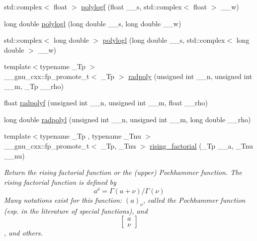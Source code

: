 \begin{DoxyCompactItemize}
\item 
std\+::complex$<$ float $>$ \hyperlink{group__gnu__math__spec__func_ga5376edb72358b777035a78b929deb49f}{polylogf} (float \+\_\+\+\_\+s, std\+::complex$<$ float $>$ \+\_\+\+\_\+w)
\item 
long double \hyperlink{group__gnu__math__spec__func_ga3aa007b4b4e345c30be015ab145d5598}{polylogl} (long double \+\_\+\+\_\+s, long double \+\_\+\+\_\+w)
\item 
std\+::complex$<$ long double $>$ \hyperlink{group__gnu__math__spec__func_ga9eb79e506eda210610bc59c1912b4d0f}{polylogl} (long double \+\_\+\+\_\+s, std\+::complex$<$ long double $>$ \+\_\+\+\_\+w)
\item 
{\footnotesize template$<$typename \+\_\+\+Tp $>$ }\\\+\_\+\+\_\+gnu\+\_\+cxx\+::fp\+\_\+promote\+\_\+t$<$ \+\_\+\+Tp $>$ \hyperlink{group__gnu__math__spec__func_ga195db2592888b7a8df870d9eaeff8d05}{radpoly} (unsigned int \+\_\+\+\_\+n, unsigned int \+\_\+\+\_\+m, \+\_\+\+Tp \+\_\+\+\_\+rho)
\item 
float \hyperlink{group__gnu__math__spec__func_ga8a98d7c7c14f1aadff90123a114fa2c9}{radpolyf} (unsigned int \+\_\+\+\_\+n, unsigned int \+\_\+\+\_\+m, float \+\_\+\+\_\+rho)
\item 
long double \hyperlink{group__gnu__math__spec__func_ga377febebd1096400897170bb7a76cd3a}{radpolyl} (unsigned int \+\_\+\+\_\+n, unsigned int \+\_\+\+\_\+m, long double \+\_\+\+\_\+rho)
\item 
{\footnotesize template$<$typename \+\_\+\+Tp , typename \+\_\+\+Tnu $>$ }\\\+\_\+\+\_\+gnu\+\_\+cxx\+::fp\+\_\+promote\+\_\+t$<$ \+\_\+\+Tp, \+\_\+\+Tnu $>$ \hyperlink{group__gnu__math__spec__func_gae8c36a0e1f60254cf212a3806f7c675c}{rising\+\_\+factorial} (\+\_\+\+Tp \+\_\+\+\_\+a, \+\_\+\+Tnu \+\_\+\+\_\+nu)
\begin{DoxyCompactList}\small\item\em Return the rising factorial function or the (upper) Pochhammer function. The rising factorial function is defined by \[ a^{\overline{\nu}} = \Gamma(a + \nu) / \Gamma(\nu) \] Many notations exist for this function\+: $ (a)_\nu $, called the Pochhammer function (esp. in the literature of special functions), and \[ \left[ \begin{array}{c} a \\ \nu \end{array} \right] \], and others. \end{DoxyCompactList}\item 

\end{DoxyCompactItemize}

